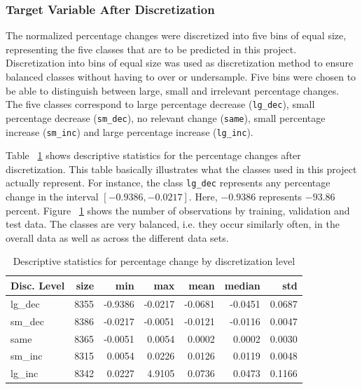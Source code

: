 \documentclass{article}
\begin{document}
	\subsubsection{Target Variable After Discretization}
		
	The normalized percentage changes were discretized into five bins of equal size, representing the five classes that are to be predicted in this project. Discretization into bins of equal size was used as discretization method to ensure balanced classes without having to over or undersample. Five bins were chosen to be able to distinguish between large, small and irrelevant percentage changes. The five classes correspond to large percentage decrease (\lstinline{lg_dec}), small percentage decrease (\lstinline{sm_dec}), no relevant change (\lstinline{same}), small percentage increase (\lstinline{sm_inc}) and large percentage increase (\lstinline{lg_inc}).
	
	Table ~\ref{table:stats_by_target} shows descriptive statistics for the percentage changes after discretization. This table basically illustrates what the classes used in this project actually represent. For instance, the class  \lstinline{lg_dec} represents any percentage change in the interval $[-0.9386, -0.0217]$. Here, $-0.9386$ represents $-93.86$ percent. Figure ~\ref{table:stats_by_target} shows the number of observations by training, validation and test data. The classes are very balanced, i.e. they occur similarly often, in the overall data as well as across the different data sets.
	
	\begin{table}[h!]
		\centering
		\caption{Descriptive statistics for percentage change by discretization level}
		\label{table:stats_by_target}
	
		\begin{tabular}{lrrrrrr}
			\toprule
			Disc. Level &  size &     min &     max &    mean &  median &     std \\
			\midrule
			lg\_dec &  8355 & -0.9386 & -0.0217 & -0.0681 & -0.0451 &  0.0687 \\
			sm\_dec &  8386 & -0.0217 & -0.0051 & -0.0121 & -0.0116 &  0.0047 \\
			same   &  8365 & -0.0051 &  0.0054 &  0.0002 &  0.0002 &  0.0030 \\
			sm\_inc &  8315 &  0.0054 &  0.0226 &  0.0126 &  0.0119 &  0.0048 \\
			lg\_inc &  8342 &  0.0227 &  4.9105 &  0.0736 &  0.0473 &  0.1166 \\
			\bottomrule
		\end{tabular}
	\end{table}%
\end{document}
